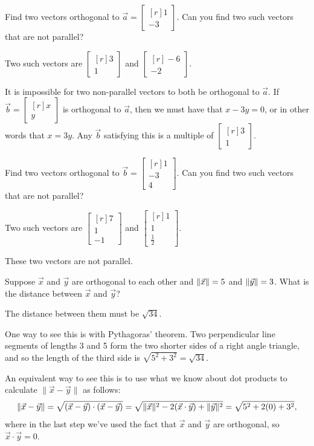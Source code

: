 \documentclass{problemset}
\newcommand{\mat}[1]{\begin{bmatrix*}[r]#1\end{bmatrix*}}
\DeclarePairedDelimiter\norm{\lVert}{\rVert}
\begin{document}
	\question
	\begin{parts}
		\item Find two vectors orthogonal to $\vec a=\mat{1\\-3}$.  Can you find 
			two such vectors that are not parallel?
			\begin{solution}
				Two such vectors are $\mat{3\\1}$ and $\mat{-6\\-2}$. 

				It is impossible for two non-parallel vectors to both be
				orthogonal to $\vec a$. If $\vec b = \mat{x\\y}$ is orthogonal to
				$\vec a$, then we must have that $x - 3y = 0$, or in other words 
				that $x = 3y$. Any $\vec b$ satisfying this is a multiple of 
				$\mat{3\\1}$. 
			\end{solution}
		\item Find two vectors orthogonal to $\vec b=\mat{1\\-3\\4}$.  Can you 
			find two such vectors that are not parallel?
			\begin{solution}
				Two such vectors are $\mat{7\\1\\-1}$ and $\mat{1\\1\\\frac{1}{2}}$.

				These two vectors are not parallel. 
			\end{solution}
		\item Suppose $\vec x$ and $\vec y$ are orthogonal to each other and 
			$\norm{\vec x}=5$ and $\norm{\vec y}=3$. What is the distance between 
			$\vec x$ and $\vec y$?
			\begin{solution}
				The distance between them must be $\sqrt{34}$. 

				One way to see this is with Pythagoras' theorem. Two perpendicular 
				line segments of lengths 3 and 5 form the two shorter sides of a 
				right angle triangle, and so the length of the third side is
				$\sqrt{5^2 + 3^2} = \sqrt{34}$. 

				An equivalent way to see this is to use what we know about dot 
				products to calculate $\|\vec x-\vec y\|$ as follows:
				\[
					\norm{\vec x-\vec y} = \sqrt{(\vec x-\vec y)\cdot(\vec x-\vec y)}
					= \sqrt{\norm{\vec x}^2 - 2(\vec x\cdot\vec y) + \norm{\vec y}^2}
					= \sqrt{5^2 + 2(0) + 3^2},
				\]
				where in the last step we've used the fact that $\vec x$ and $\vec y$
				are orthogonal, so $\vec x\cdot\vec y = 0$. 
			\end{solution}
	\end{parts}
\end{document}
